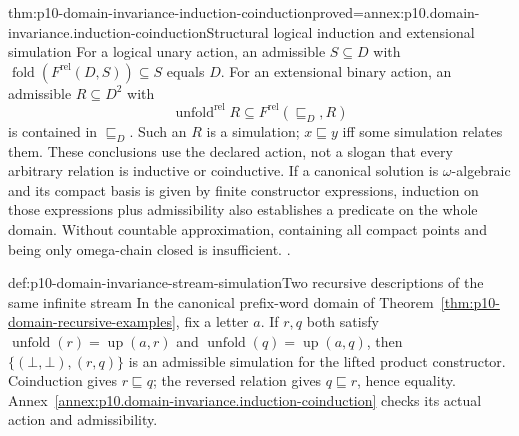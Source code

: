 \begin{hbtheorem}{thm:p10-domain-invariance-induction-coinduction}{proved=annex:p10.domain-invariance.induction-coinduction}{Structural logical induction and extensional simulation}
For a logical unary action, an admissible \(S\subseteq D\)
with \(\operatorname{fold}(F^{\mathrm{rel}}(D,S))\subseteq S\)
equals \(D\). For an extensional binary action, an admissible
\(R\subseteq D^2\) with
\[
 \operatorname{unfold}^{\mathrm{rel}}R
                       \subseteq F^{\mathrm{rel}}(\sqsubseteq_D,R)
\]
is contained in \(\sqsubseteq_D\). Such an \(R\) is a
simulation; \(x\sqsubseteq y\) iff some simulation relates
them. These conclusions use the declared action, not a slogan
that every arbitrary relation is inductive or coinductive.
If a canonical solution is \(\omega\)-algebraic and its
compact basis is given by finite constructor expressions, induction
on those expressions plus admissibility
also establishes a predicate on the whole domain. Without
countable approximation, containing all compact points and
being only omega-chain closed is insufficient.
\cite[Sections~5.4.1--4; Theorems~5.4.7,5.4.9;
Corollary~5.4.10; Proposition~2.2.13, pp.~22,79--83]
{AbramskyJungCorrectedExpandedDomainTheory}.
\end{hbtheorem}

\begin{hbexample}{def:p10-domain-invariance-stream-simulation}{Two recursive descriptions of the same infinite stream}
In the canonical prefix-word domain of
Theorem~\ref{thm:p10-domain-recursive-examples}, fix a letter \(a\).
If \(r,q\) both satisfy
\(\operatorname{unfold}(r)=\operatorname{up}(a,r)\) and
\(\operatorname{unfold}(q)=\operatorname{up}(a,q)\), then
\(\{(\bot,\bot),(r,q)\}\) is an admissible simulation for
the lifted product constructor. Coinduction gives \(r\sqsubseteq q\);
the reversed relation gives \(q\sqsubseteq r\), hence equality.
Annex~\ref{annex:p10.domain-invariance.induction-coinduction}
checks its actual action and admissibility.
\end{hbexample}

